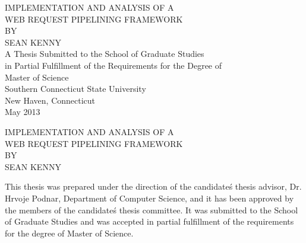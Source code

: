 \documentclass[12pt]{report}
\begin{document}

\newpage
\thispagestyle{empty}
\vspace*{\fill}
\begin{center}
	\large 
	\MakeTextUppercase{Implementation and Analysis of a} \\
	\MakeTextUppercase{Web Request Pipelining Framework} \\ 
	\MakeTextUppercase{By} \\
	\MakeTextUppercase{Sean Kenny} \\
	A Thesis Submitted to the School of Graduate Studies \\
	in Partial Fulfillment of the Requirements for the Degree of \\
	Master of Science \\
	\vspace{.5in}
	Southern Connecticut State University \\
	New Haven, Connecticut \\
	May 2013
\end{center}
\vspace*{\fill}

\newpage
\thispagestyle{plain}
\setcounter{page}{2}
\vspace*{0in}
\begin{center}
	\large 
	\MakeTextUppercase{Implementation and Analysis of a} \\
	\MakeTextUppercase{Web Request Pipelining Framework} \\ 
	\MakeTextUppercase{By} \\
	\MakeTextUppercase{Sean Kenny} \\
\end{center}
This thesis was prepared under the direction of the candidate\'s thesis advisor, Dr. Hrvoje Podnar, Department of Computer Science, and it has been approved by the members of the candidate\'s thesis committee. It was submitted to the School of Graduate Studies and was accepted in partial fulfillment of the requirements for the degree of Master of Science.
\end{document}
